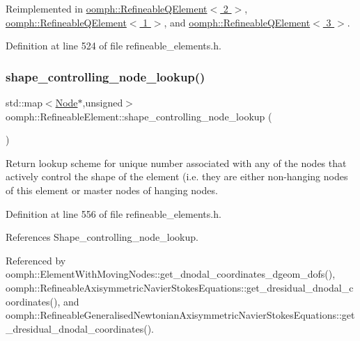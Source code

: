 Reimplemented in \hyperlink{classoomph_1_1RefineableQElement_3_012_01_4_a2f682eed221473eb97ff70e999fdad65}{oomph\+::\+Refineable\+Q\+Element$<$ 2 $>$}, \hyperlink{classoomph_1_1RefineableQElement_3_011_01_4_a079b7ddf04c9597d2394f078e56aeb48}{oomph\+::\+Refineable\+Q\+Element$<$ 1 $>$}, and \hyperlink{classoomph_1_1RefineableQElement_3_013_01_4_aceb41f87bfce0e333ee0a713e382075f}{oomph\+::\+Refineable\+Q\+Element$<$ 3 $>$}.



Definition at line 524 of file refineable\+\_\+elements.\+h.

\mbox{\label{classoomph_1_1RefineableElement_a638aa460036a87f73a2bbba92b13c69f}} 
\subsubsection{\texorpdfstring{shape\+\_\+controlling\+\_\+node\+\_\+lookup()}{shape\_controlling\_node\_lookup()}}
{\footnotesize\ttfamily std\+::map$<$\hyperlink{classoomph_1_1Node}{Node}$\ast$,unsigned$>$ oomph\+::\+Refineable\+Element\+::shape\+\_\+controlling\+\_\+node\+\_\+lookup (\begin{DoxyParamCaption}{ }\end{DoxyParamCaption})\hspace{0.3cm}{\ttfamily [inline]}}



Return lookup scheme for unique number associated with any of the nodes that actively control the shape of the element (i.\+e. they are either non-\/hanging nodes of this element or master nodes of hanging nodes. 



Definition at line 556 of file refineable\+\_\+elements.\+h.



References Shape\+\_\+controlling\+\_\+node\+\_\+lookup.



Referenced by oomph\+::\+Element\+With\+Moving\+Nodes\+::get\+\_\+dnodal\+\_\+coordinates\+\_\+dgeom\+\_\+dofs(), oomph\+::\+Refineable\+Axisymmetric\+Navier\+Stokes\+Equations\+::get\+\_\+dresidual\+\_\+dnodal\+\_\+coordinates(), and oomph\+::\+Refineable\+Generalised\+Newtonian\+Axisymmetric\+Navier\+Stokes\+Equations\+::get\+\_\+dresidual\+\_\+dnodal\+\_\+coordinates().

